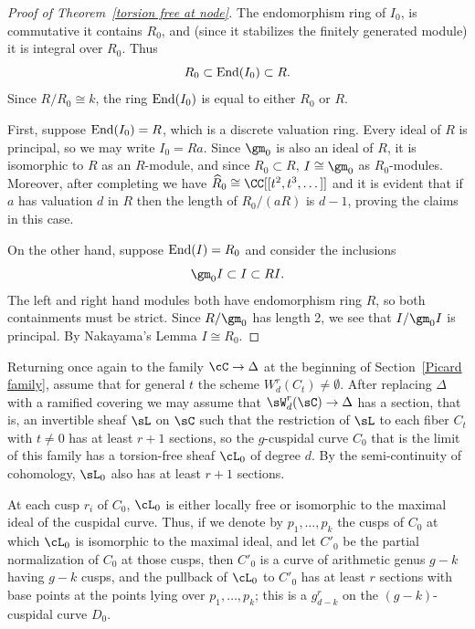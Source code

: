 \begin{proof}[Proof of Theorem~\ref{torsion free at node}] 

\def\End{{\rm End}}

The endomorphism ring of $I_0$, is commutative it contains $R_0$,  and (since it stabilizes the finitely
generated module) it is integral over $R_0$. Thus
$$
R_0 \subset \End(I_0) \subset R.
$$
Since
$R/R_0 \cong k$, the ring $\End(I_0)$ is equal to either 
$R_0$ or $R$. 

First, suppose
$\End(I_{0})=R$, which is a discrete valuation ring. Every ideal of $R$ is principal, so we may write $I_{0} = Ra$.
 Since $\gm_0$ is also an ideal of $R$, it is isomorphic to $R$
as an $R$-module, and since $R_0\subset R$,
$I \cong \gm_0$ as $R_0$-modules. Moreover, after completing we have $\widehat R_{0} \cong \CC[[t^{2}, t^{3}, \dots]]$ and it is evident that if $a$ has valuation $d$ in $R$ then the length of $R_{0}/(aR)$ is $d-1$, proving the claims in this case.

On the other hand, suppose
$\End(I)=R_0$
 and consider the inclusions
$$
\gm_0 I \subset I \subset R I.
$$
The left and right hand modules both have endomorphism ring $R$,
so both containments must be strict. Since $R/\gm_0$ has length 2,
we see that $I/\gm_0 I$ is principal. By Nakayama's Lemma $I\cong R_0$.
\end{proof}

Returning once again to the family $\cC \to \Delta$ at the beginning of Section~\ref{Picard family}, assume that for general $t$ the scheme $W^{r}_{d}(C_t)\neq \emptyset$. After replacing $\Delta$ with a ramified covering
we may assume that $\sW^{r}_{d}(\sC) \to \Delta$ has a section, that is, an invertible sheaf $\sL$ on $\sC$
 such that the restriction of $\sL$ to each fiber $C_{t}$ with $t\neq 0$ has at least $r+1$ sections, so the $g$-cuspidal curve $C_0$ that is the limit of this family has a torsion-free sheaf $\cL_0$ of degree $d$. By the semi-continuity
 of cohomology, $\sL_{0}$ also has at least $r+1$ sections. 

At each cusp $r_i$ of $C_0$, $\cL_0$ is either locally free or isomorphic to the maximal ideal of the cuspidal curve. Thus, if we denote by $p_1,\dots, p_k$ the cusps of $C_0$ at which $\cL_0$ is isomorphic to the maximal ideal, and let $C'_{0}$ be the partial normalization of $C_0$ at those cusps, then $C'_{0}$ is a curve of arithmetic genus $g-k$ having $g-k$ cusps, and the pullback of $\cL_0$ to $C'_{0}$ has at least $r$ sections with base points at the points lying over $p_1,\dots,p_k$;  this is a $g^r_{d-k}$ on the $(g-k)$-cuspidal curve  $D_0$.



